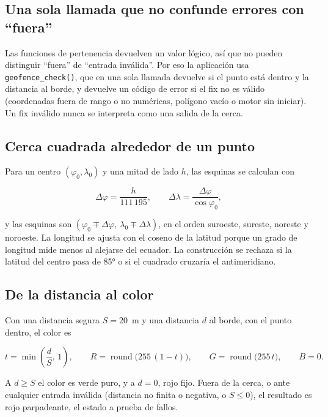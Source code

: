 \subsection{Una sola llamada que no confunde errores con ``fuera''}

Las funciones de pertenencia devuelven un valor lógico, así que no pueden distinguir ``fuera'' de
``entrada inválida''. Por eso la aplicación usa \texttt{geofence\_check()}, que en una sola llamada
devuelve si el punto está dentro y la distancia al borde, y devuelve un código de error si el fix
no es válido (coordenadas fuera de rango o no numéricas, polígono vacío o motor sin iniciar). Un
fix inválido nunca se interpreta como una salida de la cerca.

\subsection{Cerca cuadrada alrededor de un punto}

Para un centro $(\varphi_0, \lambda_0)$ y una mitad de lado $h$, las esquinas se calculan con

\begin{equation}
\Delta\varphi = \frac{h}{111\,195}, \qquad \Delta\lambda = \frac{\Delta\varphi}{\cos\varphi_0},
\end{equation}

y las esquinas son $(\varphi_0 \mp \Delta\varphi,\ \lambda_0 \mp \Delta\lambda)$, en el orden
suroeste, sureste, noreste y noroeste. La longitud se ajusta con el coseno de la latitud porque un
grado de longitud mide menos al alejarse del ecuador. La construcción se rechaza si la latitud del
centro pasa de 85° o si el cuadrado cruzaría el antimeridiano.

\subsection{De la distancia al color}

Con una distancia segura $S = 20$~m y una distancia $d$ al borde, con el punto dentro, el color es

\begin{equation}
t = \min\!\left(\frac{d}{S},\,1\right), \qquad
R = \operatorname{round}\bigl(255\,(1-t)\bigr), \qquad
G = \operatorname{round}\bigl(255\,t\bigr), \qquad B = 0.
\end{equation}

A $d \ge S$ el color es verde puro, y a $d = 0$, rojo fijo. Fuera de la cerca, o ante cualquier
entrada inválida (distancia no finita o negativa, o $S \le 0$), el resultado es rojo
parpadeante, el estado a prueba de fallos.

